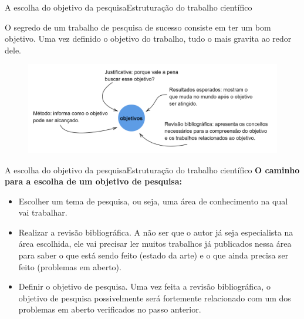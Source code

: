 \documentclass[t]{beamer}
\begin{document}


\begin{ftst}{A escolha do objetivo da pesquisa}{Estruturação do trabalho científico}
\justifying

O segredo de um trabalho de pesquisa de sucesso consiste em ter um bom objetivo. Uma vez definido o objetivo do trabalho, tudo o mais gravita ao redor dele. 
\vone

\begin{figure}
    \centering
    \includegraphics[scale=0.13]{Figuras/03_objetivos.png}
    \label{fig:objetivos}
\end{figure}

\end{ftst}


\begin{ftst}{A escolha do objetivo da pesquisa}{Estruturação do trabalho científico}
\justifying
\textbf{O caminho para a escolha de um objetivo de pesquisa:}
\vone
\begin{itemize}
    \item Escolher um tema de pesquisa, ou seja, uma área de conhecimento na qual vai trabalhar.
    \item Realizar a revisão bibliográfica. A não ser que o autor já seja especialista na área escolhida, ele vai precisar ler muitos trabalhos já publicados nessa área para saber o que está sendo feito (estado da arte) e o que ainda precisa ser feito (problemas em aberto).
    \item Definir o objetivo de pesquisa. Uma vez feita a revisão bibliográfica, o objetivo de pesquisa possivelmente será fortemente relacionado com um dos problemas em aberto verificados no passo anterior.
\end{itemize}

\end{ftst}

\end{document}
